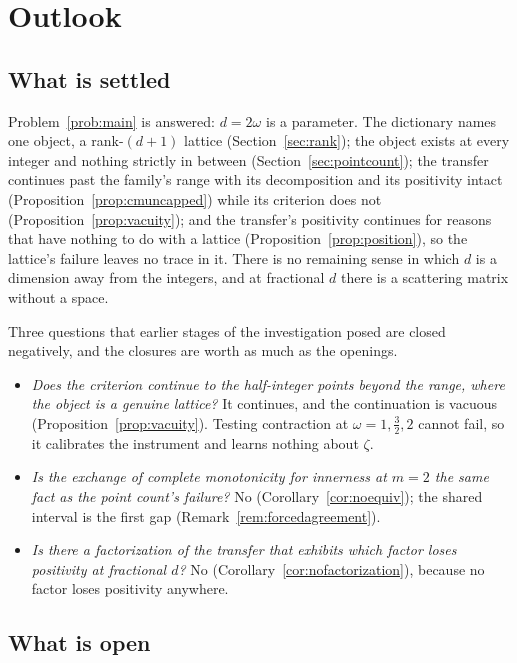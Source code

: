 \section{Outlook}\label{sec:outlook}

\subsection{What is settled}\label{sec:settled}

Problem~\ref{prob:main} is answered: $d=2\omega$ is a parameter. The dictionary
names one object, a rank-$(d{+}1)$ lattice (Section~\ref{sec:rank}); the object
exists at every integer and nothing strictly in between
(Section~\ref{sec:pointcount}); the transfer continues past the family's range
with its decomposition and its positivity intact
(Proposition~\ref{prop:cmuncapped}) while its criterion does not
(Proposition~\ref{prop:vacuity}); and the transfer's positivity continues for
reasons that have nothing to do with a lattice
(Proposition~\ref{prop:position}), so the lattice's failure leaves no trace in
it. There is no remaining sense in which $d$ is a dimension away from the
integers, and at fractional $d$ there is a scattering matrix without a space.

Three questions that earlier stages of the investigation posed are closed
negatively, and the closures are worth as much as the openings.

\begin{itemize}
\item \emph{Does the criterion continue to the half-integer points beyond the
 range, where the object is a genuine lattice?} It continues, and the
 continuation is vacuous (Proposition~\ref{prop:vacuity}). Testing contraction at
 $\omega=1,\frac32,2$ cannot fail, so it calibrates the instrument and learns
 nothing about $\zeta$.
\item \emph{Is the exchange of complete monotonicity for innerness at $m=2$ the
 same fact as the point count's failure?} No (Corollary~\ref{cor:noequiv}); the
 shared interval is the first gap (Remark~\ref{rem:forcedagreement}).
\item \emph{Is there a factorization of the transfer that exhibits which factor
 loses positivity at fractional $d$?} No (Corollary~\ref{cor:nofactorization}),
 because no factor loses positivity anywhere.
\end{itemize}

\subsection{What is open}\label{sec:open}

